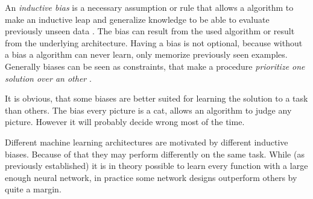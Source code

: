 An \emph{inductive bias} is a necessary assumption or rule that allows a algorithm to make an inductive leap and generalize knowledge to be able to evaluate previously unseen data \cite{needForBias}.
The bias can result from the used algorithm or result from the underlying architecture.
Having a bias is not optional, because without a bias a algorithm can never \glqq learn\grqq{}, only memorize previously seen examples.
Generally biases can be seen as constraints, that make a procedure \emph{prioritize one solution over an other} \cite[]{relationalInductiveBiasesAndGraphNetworks}. 

It is obvious, that some biases are better suited for learning the solution to a task than others. 
The bias \glqq every picture is a cat\grqq{}, allows an algorithm to judge any picture. 
However it will probably decide wrong most of the time.

Different machine learning architectures are motivated by different inductive biases. 
Because of that they may perform differently on the same task.
While (as previously established) it is in theory possible to learn every function with a large enough neural network, in practice some network designs outperform others by quite a margin.